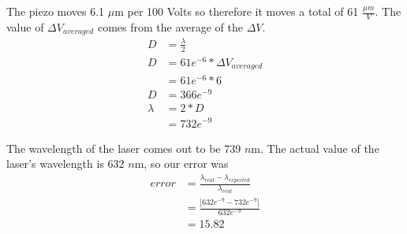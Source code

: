 	The piezo moves 6.1 $\mu$m per 100 Volts so therefore it moves a total of 61 $\frac{\mu m}{V}$.
	The value of $\Delta V_{averaged}$ comes from the average of the $\Delta V$.
\begin{align*}
	D &= \frac{\lambda}{2} \\
	D &= 61e^{-6} * \Delta V_{averaged} \\
	  &= 61e^{-6} * 6 \\
	D &= 366e^{-9} \\
	\lambda &= 2*D \\
	 &= 732e^{-9}	
\end{align*}

The wavelength of the laser comes out to be 739 $n$m. The actual value of the laser's wavelength is 632 $n$m, so our error was 
	\begin{align*}
		error &=\frac{\lambda_{real}-\lambda_{expected}}{\lambda_{real}} \\
			&= \frac{|632e^{-9}-732e^{-9}|}{632e^{-9}}	\\	
			&= 15.82
	\end{align*}

